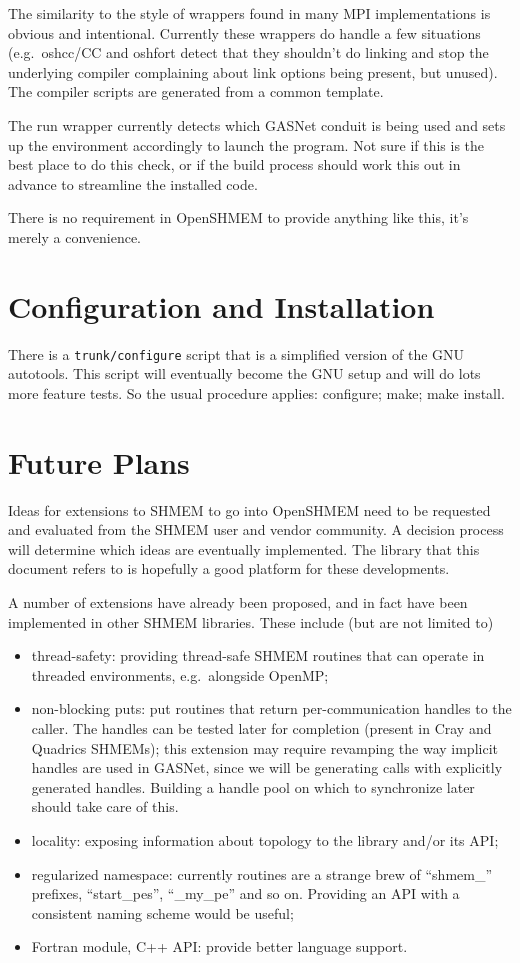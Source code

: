 \documentclass[english]{article}
\begin{document}
The similarity to the style of wrappers found in many MPI
implementations is obvious and intentional. Currently these wrappers
do handle a few situations (e.g.\ oshcc/CC and oshfort detect that they
shouldn't do linking and stop the underlying compiler complaining
about link options being present, but unused). The compiler scripts
are generated from a common template.

The run wrapper currently detects which GASNet conduit is being used
and sets up the environment accordingly to launch the program. Not
sure if this is the best place to do this check, or if the build
process should work this out in advance to streamline the installed
code.

There is no requirement in OpenSHMEM to provide anything like this,
it's merely a convenience.

\section{Configuration and Installation}

There is a \texttt{trunk/configure} script that is a simplified
version of the GNU autotools. This script will eventually become the
GNU setup and will do lots more feature tests. So the usual procedure
applies: configure; make; make install.

\section{Future Plans}

Ideas for extensions to SHMEM to go into OpenSHMEM need to be
requested and evaluated from the SHMEM user and vendor community. A
decision process will determine which ideas are eventually
implemented. The library that this document refers to is hopefully a
good platform for these developments.

A number of extensions have already been proposed, and in fact have
been implemented in other SHMEM libraries. These include (but are not
limited to)

\begin{itemize}
\item thread-safety: providing thread-safe SHMEM routines that can
operate in threaded environments, e.g.\ alongside OpenMP;
\item non-blocking puts: put routines that return per-communication
handles to the caller. The handles can be tested later for completion
(present in Cray and Quadrics SHMEMs); this extension may require
revamping the way implicit handles are used in GASNet, since we will
be generating calls with explicitly generated handles. Building a
handle pool on which to synchronize later should take care of this.
\item locality: exposing information about topology to the library
and/or its API;
\item regularized namespace: currently routines are a strange brew of
``shmem\_'' prefixes, ``start\_pes'', ``\_my\_pe'' and so
on. Providing an API with a consistent naming scheme would be useful;
\item Fortran module, C++ API: provide better language support.
\end{itemize}
\end{document}
